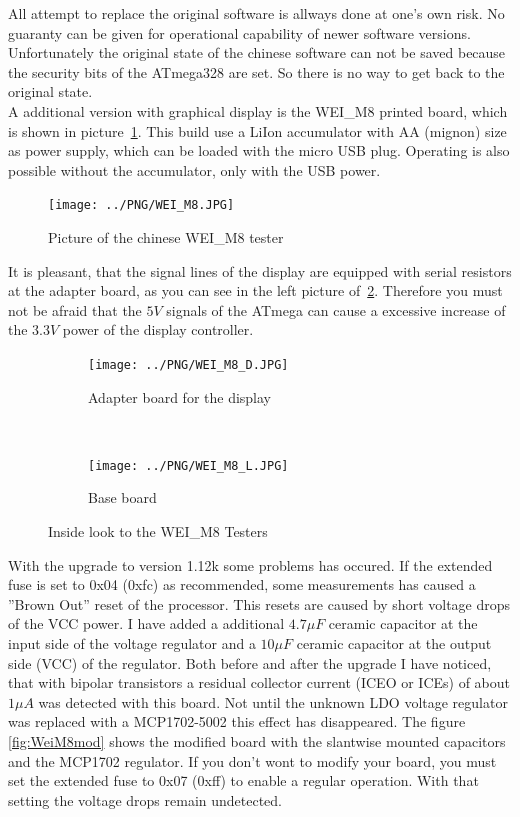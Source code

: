 All attempt to replace the original software is allways done at one's own risk.
No guaranty can be given for operational capability of newer software versions.
Unfortunately the original state of the chinese software can not be saved because the 
security bits of the ATmega328 are set. So there is no way to get back to the original state.\\


A additional version with graphical display is the WEI\_M8 printed board, which is shown in picture~\ref{fig:WeiM8}.
This build use a LiIon accumulator with AA (mignon) size as power supply, which can be loaded
with the micro USB plug. Operating is also possible without the accumulator, only with the USB power.

\begin{figure}[H]
\centering
\texttt{[image: ../PNG/WEI\_M8.JPG]}
\caption{Picture of the chinese WEI\_M8 tester}
\label{fig:WeiM8}
\end{figure}

It is pleasant, that the signal lines of the display are equipped with serial resistors
at the adapter board, as you can see in the left picture of~\ref{fig:WeiM8int}.
Therefore you must not be afraid that the \(5V\) signals of the ATmega can cause a excessive
increase of the \(3.3V\) power of the display controller.

\begin{figure}[H]
  \begin{subfigure}[b]{9cm}
    \centering
    \texttt{[image: ../PNG/WEI\_M8\_D.JPG]}
    \caption{Adapter board for the display}
  \end{subfigure}
  ~
  \begin{subfigure}[b]{9cm}
    \centering
    \texttt{[image: ../PNG/WEI\_M8\_L.JPG]}
    \caption{Base board}
  \end{subfigure}
  \caption{Inside look to the WEI\_M8 Testers}
  \label{fig:WeiM8int}
\end{figure}

With the upgrade to version 1.12k some problems has occured.
If the extended fuse is set to 0x04 (0xfc) as recommended, some measurements has
caused a ''Brown Out'' reset of the processor.
This resets are caused by short voltage drops of the VCC power.
I have added a additional \(4.7\mu F\) ceramic capacitor at the input side of
the voltage regulator and a \(10\mu F\) ceramic capacitor at the output side (VCC)
of the regulator.
Both before and after the upgrade I have noticed, that with bipolar transistors
a residual collector current (ICEO or ICEs) of about \(1\mu A\) was detected with this board.
Not until the unknown LDO voltage regulator was replaced with a MCP1702-5002 this
effect has disappeared. The figure \ref{fig:WeiM8mod} shows the modified board with
the slantwise mounted capacitors and the MCP1702 regulator.
If you don't wont to modify your board, you must set the extended fuse to 0x07 (0xff)
to enable a regular operation. With that setting the voltage drops remain undetected.


